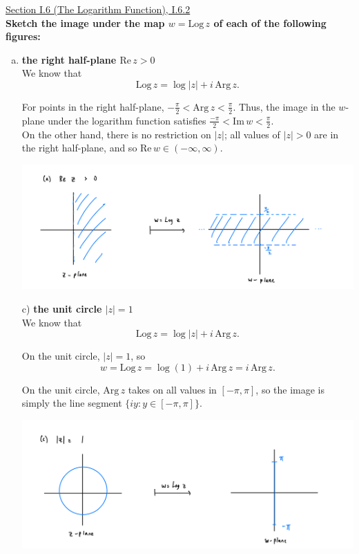 \documentclass[11pt]{article}
\theoremstyle{definition}
\begin{document}
\newpage

\underline{Section I.6 (The Logarithm Function), I.6.2} \\

\textbf{Sketch the image under the map $w = \mathrm{Log} \, z$ of each of the following figures:}

\begin{enumerate}[a)]
\item \textbf{the right half-plane $\mathrm{Re} \, z > 0$} \\

We know that \[\mathrm{Log} \, z = \log |z| + i \, \mathrm{Arg} \, z.\]

For points in the right half-plane, $-\frac{\pi}{2} < \mathrm{Arg} \, z < \frac{\pi}{2}$. Thus, the image in the $w$-plane under the logarithm function satisfies $\frac{-\pi}{2} < \mathrm{Im} \, w < \frac{\pi}{2}.$ \\

On the other hand, there is no restriction on $|z|$; all values of $|z| > 0$ are in the right half-plane, and so $\mathrm{Re} \, w \in (-\infty, \infty)$. 

\begin{center}
\includegraphics*[scale = 0.15]{I.6.2a.jpeg}
\end{center}

\item[c)] \textbf{the unit circle $|z| = 1$} \\

We know that \[\mathrm{Log} \, z = \log |z| + i \, \mathrm{Arg} \, z.\]

On the unit circle, $|z| = 1$, so 
\[ w = \mathrm{Log} \, z = \log (1) + i \, \mathrm{Arg} \, z = i \, \mathrm{Arg} \, z.\]

On the unit circle, $\mathrm{Arg} \, z$ takes on all values in $[-\pi, \pi]$, so the image is simply the line segment $\{i y : y \in [-\pi, \pi]\}.$ 


\begin{center}
  \includegraphics*[scale = 0.15]{I.6.2c.jpeg}
\end{center}



\end{enumerate}
\end{document}
